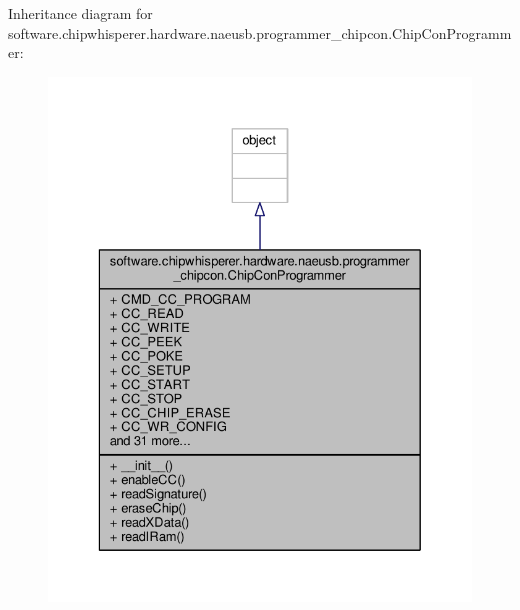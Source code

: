 Inheritance diagram for software.\+chipwhisperer.\+hardware.\+naeusb.\+programmer\+\_\+chipcon.\+Chip\+Con\+Programmer\+:\nopagebreak
\begin{figure}[H]
\begin{center}
\leavevmode
\includegraphics[width=329pt]{da/d23/classsoftware_1_1chipwhisperer_1_1hardware_1_1naeusb_1_1programmer__chipcon_1_1ChipConProgrammer__inherit__graph}
\end{center}
\end{figure}


